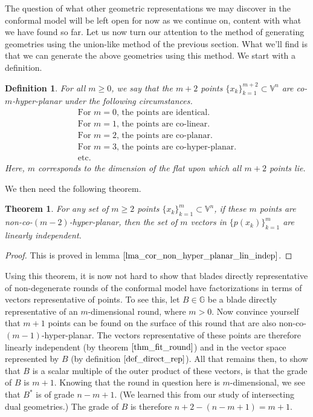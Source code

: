 \documentclass[12pt]{article}
\newcommand{\G}{\mathbb{G}}
\newcommand{\V}{\mathbb{V}}
\newtheorem{theorem}{Theorem}[section]
\newtheorem{definition}{Definition}[section]
\begin{document}
The question of what other geometric representations we may discover in the conformal model
will be left open for now as we continue on, content with what we have
found so far.  Let us now turn our attention to the method of generating
geometries using the union-like method of the previous section.  What we'll
find is that we can generate the above geometries using this method.
We start with a definition.
\begin{definition}
For all $m\geq 0$, we say that the $m+2$ points $\{x_k\}_{k=1}^{m+2}\subset\V^n$
are co-$m$-hyper-planar under the following circumstances.
\begin{equation*}
\begin{array}{l}
\mbox{For $m=0$, the points are identical.} \\
\mbox{For $m=1$, the points are co-linear.} \\
\mbox{For $m=2$, the points are co-planar.} \\
\mbox{For $m=3$, the points are co-hyper-planar.} \\
\mbox{etc.}
\end{array}
\end{equation*}
Here, $m$ corresponds to the dimension of the flat upon which all $m+2$
points lie.
\end{definition}
We then need the following theorem.
\begin{theorem}\label{thm_fit_round}
For any set of $m\geq 2$ points $\{x_k\}_{k=1}^m\subset\V^n$, if these
$m$ points are non-co-$(m-2)$-hyper-planar, then the set of $m$ vectors in $\{p(x_k)\}_{k=1}^m$
are linearly independent.
\end{theorem}
\begin{proof}
This is proved in lemma $\eqref{lma_cor_non_hyper_planar_lin_indep}$.
\end{proof}
Using this theorem, it is now not hard to show that blades directly representative
of non-degenerate rounds of the conformal model have factorizations in
terms of vectors representative of points.  To see this, let $B\in\G$ be
a blade directly representative of an $m$-dimensional round, where $m>0$.  Now convince yourself
that $m+1$ points can be found on the surface of this round that are also
non-co-$(m-1)$-hyper-planar.  The vectors representative of these
points are therefore linearly independent (by theorem $\eqref{thm_fit_round}$) and
in the vector space represented by $B$ (by definition $\eqref{def_direct_rep}$).
All that remains then, to show that $B$ is a scalar multiple of the outer product
of these vectors, is that the grade of $B$ is $m+1$.  Knowing that the round in question
here is $m$-dimensional, we see that $B^*$ is of grade $n-m+1$.  (We learned this from our
study of intersecting dual geometries.)
The grade of $B$ is therefore $n+2-(n-m+1)=m+1$.
\end{document}
